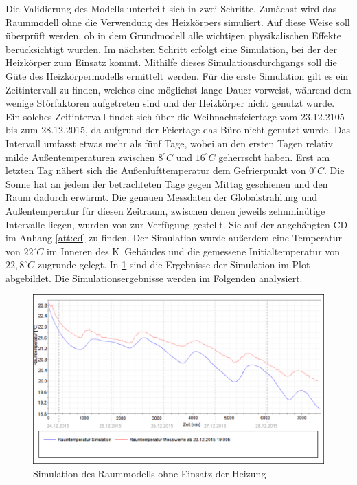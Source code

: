 Die Validierung des Modells unterteilt sich in zwei Schritte. Zunächst wird das Raummodell ohne die Verwendung des Heizkörpers simuliert. Auf diese Weise soll überprüft werden, ob in dem Grundmodell alle wichtigen physikalischen Effekte berücksichtigt wurden. Im nächsten Schritt erfolgt eine Simulation, bei der der Heizkörper zum Einsatz kommt. Mithilfe  dieses Simulationsdurchgangs soll die Güte des Heizkörpermodells ermittelt werden.
Für die erste Simulation gilt es ein Zeitintervall zu finden, welches eine möglichst lange Dauer vorweist, während dem wenige Störfaktoren aufgetreten sind und der Heizkörper nicht genutzt wurde. Ein solches Zeitintervall findet sich über die Weihnachtsfeiertage vom 23.12.2105 bis zum 28.12.2015, da aufgrund der Feiertage das Büro nicht genutzt wurde.
Das Intervall umfasst etwas mehr als fünf Tage, wobei an den ersten Tagen relativ milde Außentemperaturen zwischen $8^{\circ}C$ und $16^{\circ}C$ geherrscht haben. Erst am letzten Tag nähert sich die Außenlufttemperatur dem Gefrierpunkt von $0^{\circ}C$. Die Sonne hat an jedem der betrachteten Tage gegen Mittag geschienen und den Raum dadurch erwärmt.
Die genauen Messdaten der Globalstrahlung und Außentemperatur für diesen Zeitraum, zwischen denen jeweils zehnminütige Intervalle liegen, wurden von \cite{wetter} zur Verfügung gestellt. Sie auf der angehängten CD im Anhang \ref{att:cd} zu finden.
Der Simulation wurde außerdem eine Temperatur von $22^{\circ}C$ im Inneren des K~Gebäudes und die gemessene Initialtemperatur von $22,8^{\circ}C$ zugrunde gelegt. In \ref{fig:valid1} sind die Ergebnisse der Simulation im Plot abgebildet. Die Simulationsergebnisse  werden im Folgenden analysiert.


\begin{figure}
\centering
\includegraphics[width=\textwidth]{abbildungen/20160328_validierung1}
\caption{Simulation des Raummodells ohne Einsatz der Heizung}
\label{fig:valid1}
\end{figure}


